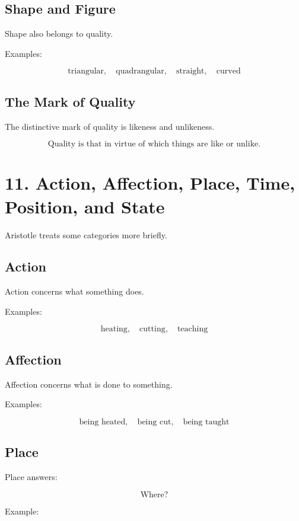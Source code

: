 \documentclass[12pt]{article}
\begin{document}
\subsection*{Shape and Figure}

Shape also belongs to quality.

Examples:

\[
\text{triangular}, \quad \text{quadrangular}, \quad \text{straight}, \quad \text{curved}
\]

\subsection*{The Mark of Quality}

The distinctive mark of quality is likeness and unlikeness.

\[
\boxed{
\text{Quality is that in virtue of which things are like or unlike.}
}
\]

\section*{11. Action, Affection, Place, Time, Position, and State}

Aristotle treats some categories more briefly.

\subsection*{Action}

Action concerns what something does.

Examples:

\[
\text{heating}, \quad \text{cutting}, \quad \text{teaching}
\]

\subsection*{Affection}

Affection concerns what is done to something.

Examples:

\[
\text{being heated}, \quad \text{being cut}, \quad \text{being taught}
\]

\subsection*{Place}

Place answers:

\[
\text{Where?}
\]

Example:
\end{document}
